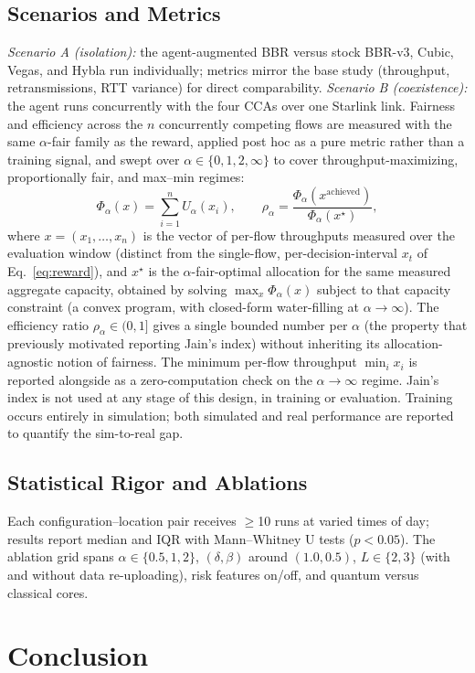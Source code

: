 \documentclass[journal]{IEEEtran}
\begin{document}
\subsection{Scenarios and Metrics}
\emph{Scenario A (isolation):} the agent-augmented BBR versus stock BBR-v3,
Cubic, Vegas, and Hybla run individually; metrics mirror the base study
(throughput, retransmissions, RTT variance) for direct comparability.
\emph{Scenario B (coexistence):} the agent runs concurrently with the four
CCAs over one Starlink link. Fairness and efficiency across the $n$
concurrently competing flows are measured with the same $\alpha$-fair family
as the reward, applied post hoc as a pure metric rather than a training
signal, and swept over $\alpha\in\{0,1,2,\infty\}$ to cover
throughput-maximizing, proportionally fair, and max--min regimes:
\begin{equation}
\Phi_\alpha(x) = \sum_{i=1}^{n} U_\alpha(x_i), \qquad
\rho_\alpha = \frac{\Phi_\alpha(x^{\mathrm{achieved}})}{\Phi_\alpha(x^\star)},
\label{eq:fairness}
\end{equation}
where $x=(x_1,\dots,x_n)$ is the vector of per-flow throughputs measured over
the evaluation window (distinct from the single-flow, per-decision-interval
$x_t$ of Eq.~\ref{eq:reward}), and $x^\star$ is the $\alpha$-fair-optimal
allocation for the same measured aggregate capacity, obtained by solving
$\max_x \Phi_\alpha(x)$ subject to that capacity constraint (a convex
program, with closed-form water-filling at $\alpha\to\infty$). The
efficiency ratio $\rho_\alpha\in(0,1]$ gives a single bounded number per
$\alpha$ (the property that previously motivated reporting Jain's
index) without inheriting its allocation-agnostic notion of fairness. The
minimum per-flow throughput $\min_i x_i$ is reported alongside as a
zero-computation check on the $\alpha\to\infty$ regime. Jain's index is not
used at any stage of this design, in training or evaluation. Training occurs
entirely in simulation; both simulated and real performance are reported to
quantify the sim-to-real gap.

\subsection{Statistical Rigor and Ablations}
Each configuration--location pair receives $\ge$10 runs at varied times of
day; results report median and IQR with Mann--Whitney U tests
($p<0.05$). The ablation grid spans $\alpha\in\{0.5,1,2\}$,
$(\delta,\beta)$ around $(1.0,0.5)$, $L\in\{2,3\}$ (with and without data
re-uploading), risk features on/off, and quantum versus classical cores.

\section{Conclusion}
\label{sec:conclusion}




\end{document}
